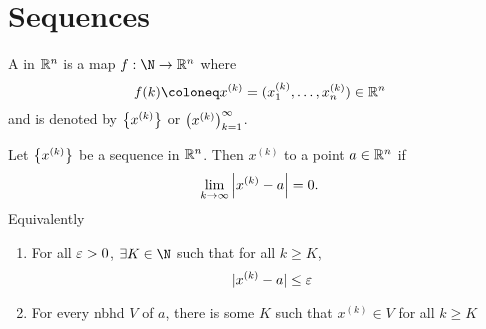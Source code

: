 \documentclass[../main.tex]{subfiles}
\begin{document}
\chapter{Sequences}

\begin{definition}[Sequence]
    A  in $\mathbb{R}^n$ is a map $f : \N \to \R^n$ where
    \[
        f(k) \coloneq x^{(k)} = (x_1^{(k)}, \ldots, x_n^{(k)}) \in \R^n
    \]
    and is denoted by $\qty{ x^{(k)} }$ or $\qty(x^{(k)})_{k=1}^\infty$.
\end{definition}

\begin{definition}[Convergence]
    Let $\qty{x^{(k)}}$ be a sequence in $\mathbb{R}^n$. Then $x^{(k)}$  to a point $a \in \mathbb{R}^n$ if
    \[
        \lim_{k \to \infty} \qty|x^{(k)} - a| = 0
    .\]
    Equivalently
    \begin{enumerate}
        \item For all $\varepsilon > 0$, $\exists K \in \N$ such that for all $k \geq K$,
        \[
            |x^{(k)} - a| \leq \varepsilon
        \]
        \item For every nbhd $V$ of $a$, there is some $K$ such that $x^{(k)} \in V$ for all $k \geq K$
    \end{enumerate}
\end{definition}
\end{document}
